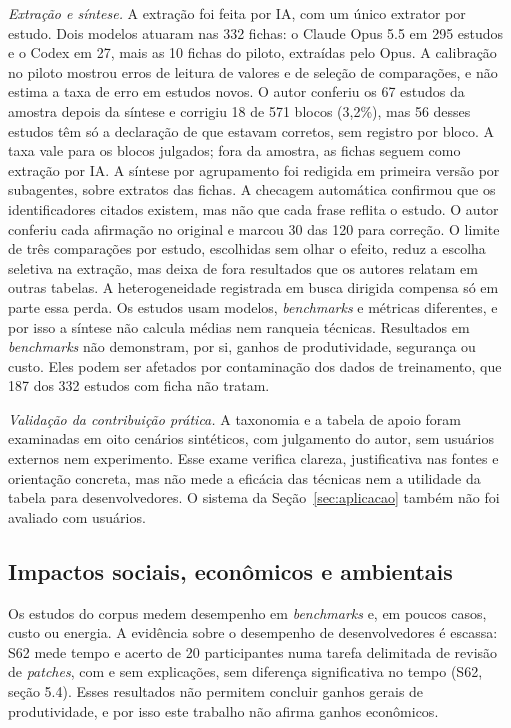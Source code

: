 \textit{Extração e síntese.} A extração foi feita por IA, com um único extrator por estudo. Dois modelos
atuaram nas 332 fichas: o Claude Opus 5.5 em 295 estudos e o Codex em 27, mais as 10 fichas do piloto,
extraídas pelo Opus. A calibração no piloto
mostrou erros de leitura de valores e de seleção de comparações, e não estima a taxa de erro em estudos novos. O autor conferiu os 67
estudos da amostra depois da síntese e corrigiu 18 de 571 blocos (3,2\%), mas 56 desses estudos têm só a
declaração de que estavam corretos, sem registro por bloco. A taxa vale para os blocos julgados; fora da amostra, as fichas seguem
como extração por IA. A síntese por agrupamento foi redigida em primeira
versão por subagentes, sobre extratos das fichas. A checagem automática confirmou que os identificadores
citados existem, mas não que cada frase reflita o estudo. O autor conferiu cada afirmação
no original e marcou 30 das 120 para correção. O limite de três comparações por estudo, escolhidas sem olhar o efeito, reduz a escolha seletiva na
extração, mas deixa de fora resultados que os autores relatam em outras tabelas. A heterogeneidade registrada em
busca dirigida compensa só em parte essa perda. Os estudos usam modelos, \textit{benchmarks} e métricas
diferentes, e por isso a síntese não calcula médias nem ranqueia técnicas. Resultados em \textit{benchmarks} não
demonstram, por si, ganhos de produtividade, segurança ou custo. Eles podem ser afetados por contaminação dos
dados de treinamento, que 187 dos 332 estudos com ficha não tratam.

\textit{Validação da contribuição prática.} A taxonomia e a tabela de apoio foram examinadas em oito cenários
sintéticos, com julgamento do autor, sem usuários externos nem experimento. Esse exame verifica clareza, justificativa nas fontes e orientação concreta, mas
não mede a eficácia das técnicas nem a utilidade da tabela para desenvolvedores. O sistema da
Seção~\ref{sec:aplicacao} também não foi avaliado com usuários.

\subsection{Impactos sociais, econômicos e ambientais}
Os estudos do corpus medem desempenho em \textit{benchmarks} e, em poucos casos, custo ou energia. A evidência sobre
o desempenho de desenvolvedores é escassa: S62 mede tempo e acerto de 20 participantes numa tarefa delimitada de
revisão de \textit{patches}, com e sem explicações, sem diferença significativa no tempo (S62, seção 5.4). Esses
resultados não permitem concluir ganhos gerais de produtividade, e por isso este trabalho não afirma ganhos
econômicos.


